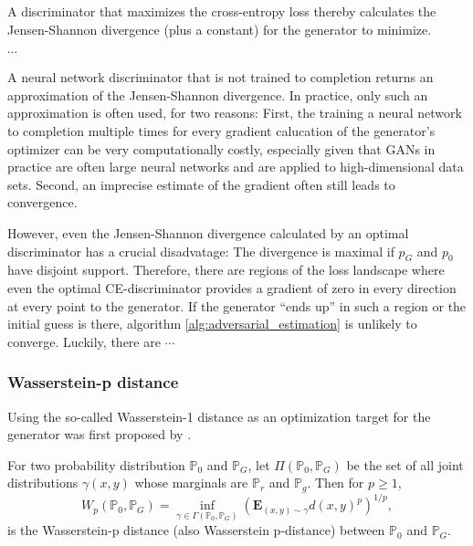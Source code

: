 A discriminator that maximizes the cross-entropy loss thereby calculates the Jensen-Shannon divergence (plus a constant) for the generator to minimize.
\begin{theorem}
    $\cdots$
\end{theorem}
A neural network discriminator that is not trained to completion returns an approximation of the Jensen-Shannon divergence.
In practice, only such an approximation is often used, for two reasons:
First, the training a neural network to completion multiple times for every gradient calucation of the generator's optimizer can be very computationally costly,
especially given that GANs in practice are often large neural networks and are applied to high-dimensional data sets.
Second, an imprecise estimate of the gradient often still leads to convergence. %

However, even the Jensen-Shannon divergence calculated by an optimal discriminator has a crucial disadvatage:
The divergence is maximal if $p_G$ and $p_0$ have disjoint support. %
Therefore, there are regions of the loss landscape where even the optimal CE-discriminator provides a gradient of zero in every direction at every point to the generator.
If the generator ``ends up'' in such a region or the initial guess is there, algorithm \ref{alg:adversarial_estimation} is unlikely to converge.
Luckily, there are $\cdots$

\subsubsection{Wasserstein-p distance}
\label{sec:wasserstein_loss}

Using the so-called Wasserstein-1 distance as an optimization target for the generator was first proposed by \Textcite{arjovsky2017wassersteingan}.%

\begin{definition}
    For two probability distribution $\mathbb{P}_0$ and $\mathbb{P}_G$, let $\Pi (\mathbb{P}_0, \mathbb{P}_G)$ be the set of all joint distributions $\gamma(x, y)$ whose marginals are $\mathbb{P}_r$ and $\mathbb{P}_g$.
    Then for $p \geq 1$,%
    $$
    W_p(\mathbb{P}_0, \mathbb{P}_G) = \inf_{\gamma \in \Gamma(\mathbb{P}_0, \mathbb{P}_G)} \left(\mathbf{E}_{(x, y) \sim \gamma} d(x, y)^p \right)^{1/p},
    $$
    is the Wasserstein-p distance (also Wasserstein p-distance) between $\mathbb{P}_0$ and $\mathbb{P}_G$.
\end{definition}

